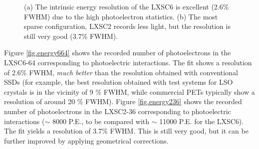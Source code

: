 \begin{figure}[!htb]
	\centering
	\caption{\label{fig.energy} (a) The intrinsic energy resolution of the LXSC6 is excellent (2.6\% FWHM) due to the high photoelectron statistics. (b) The most sparse configuration, LXSC2 records less light, but the resolution is still very good (3.7\% FWHM).}
\end{figure}

Figure \ref{fig.energy664} shows the recorded number of photoelectrons in the LXSC6-64 corresponding to photoelectric interactions. The fit shows a resolution of 2.6\% FWHM, {\em much better} than the resolution obtained with conventional SSDs (for example, the best resolution obtained with test systems for LSO crystals is in the vicinity of 9 \% FWHM, while commercial PETs typically show a resolution of around 20 \% FWHM). Figure \ref{fig.energy236} shows the recorded number of photoelectrons in the LXSC2-36 corresponding to photoelectric interactions ($\sim$ 8000 P.E., to be compared with $\sim$ 11000 P.E. for the LXSC6). The  fit yields a resolution of 3.7\% FWHM. This is still very good, but it can be further improved by applying geometrical corrections.


